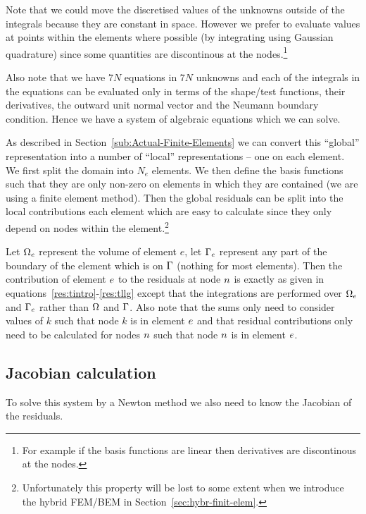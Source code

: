 Note that we could move the discretised values of the unknowns outside of the integrals because they are constant in space. However we prefer to evaluate values at points within the elements where possible (by integrating using Gaussian quadrature) since some quantities are discontinous at the nodes.\footnote{For example if the basis functions are linear then derivatives are discontinous at the nodes.}

Also note that we have $7N$ equations in $7N$ unknowns and each of the integrals in the equations can be evaluated only in terms of the shape/test functions, their derivatives, the outward unit normal vector and the Neumann boundary condition. Hence we have a system of algebraic equations which we can solve.

As described in Section~\ref{sub:Actual-Finite-Elements} we can convert this ``global'' representation into a number of ``local'' representations -- one on each element. We first split the domain into $N_e$ elements. We then define the basis functions such that they are only non-zero on elements in which they are contained (\ie we are using a finite element method). Then the global residuals can be split into the local contributions each element which are easy to calculate since they only depend on nodes within the element.\footnote{Unfortunately this property will be lost to some extent when we introduce the hybrid FEM/BEM in Section~\ref{sec:hybr-finit-elem}.}

Let $\Omega_e$ represent the volume of element $e$, let ${\Gamma}_e$ represent any part of the boundary of the element which is on ${\Gamma}$ (nothing for most elements). Then the contribution of element $e$ to the residuals at node $n$ is exactly as given in equations~\eqref{res:tintro}-\eqref{res:tllg} except that the integrations are performed over $\Omega_e$ and ${\Gamma}_e$ rather than $\Omega$ and ${\Gamma}$. Also note that the sums only need to consider values of $k$ such that node $k$ is in element $e$ and that residual contributions only need to be calculated for nodes $n$ such that node $n$ is in element $e$.

\subsection{Jacobian calculation}
\label{sec:jacobian-calculation}

To solve this system by a Newton method we also need to know the Jacobian of the residuals.

